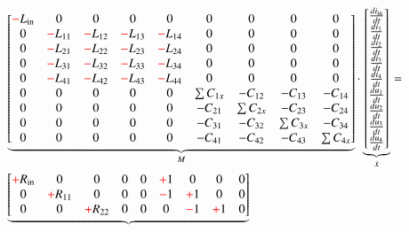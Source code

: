 \begin{refsection}
{\footnotesize 
\begin{align}
			&
			\underbrace{\begin{bmatrix}
			\color{red}-\color{black}L_\mathrm{in}&0&0&0&0 & 0&0&0&0 \\
			0&\color{red}-\color{black}L_{11}&\color{red}-\color{black}L_{12}&\color{red}-\color{black}L_{13}&\color{red}-\color{black}L_{14} & 0&0&0&0 \\
			0&\color{red}-\color{black}L_{21}&\color{red}-\color{black}L_{22}&\color{red}-\color{black}L_{23}&\color{red}-\color{black}L_{24} & 0&0&0&0 \\
			0&\color{red}-\color{black}L_{31}&\color{red}-\color{black}L_{32}&\color{red}-\color{black}L_{33}&\color{red}-\color{black}L_{34} & 0&0&0&0 \\
			0&\color{red}-\color{black}L_{41}&\color{red}-\color{black}L_{42}&\color{red}-\color{black}L_{43}&\color{red}-\color{black}L_{44} & 0&0&0&0 \\
			0&0&0&0&0 & \sum{C_{1x}}&-C_{12}&-C_{13}&-C_{14} \\
			0&0&0&0&0 & -C_{21}&\sum{C_{2x}}&-C_{23}&-C_{24} \\
			0&0&0&0&0 & -C_{31}&-C_{32}&\sum{C_{3x}}&-C_{34} \\
			0&0&0&0&0 & -C_{41}&-C_{42}&-C_{43}&\sum{C_{4x}}
			    \end{bmatrix}}_{\text{$M$}}
			\cdot
			\underbrace{\begin{bmatrix}
			\frac{di_\mathrm{in}}{dt} \\
			\frac{di_1}{dt} \\
			\frac{di_2}{dt} \\
			\frac{di_3}{dt} \\
			\frac{di_4}{dt} \\
			\frac{du_1}{dt} \\
			\frac{du_2}{dt} \\
			\frac{du_3}{dt} \\
			\frac{du_4}{dt}
			\end{bmatrix}}_{\text{$\dot{x}$}}
			= \nonumber \\
			&
			\underbrace{\begin{bmatrix}
			\color{red}+\color{black}R_\mathrm{in}&0&0&0&0 & \color{red}+\color{black}1&0&0&0 \\
			0&\color{red}+\color{black}R_{11}&0&0&0 & \color{red}-\color{black}1&\color{red}+\color{black}1&0&0 \\
			0&0&\color{red}+\color{black}R_{22}&0&0 & 0&\color{red}-\color{black}1&\color{red}+\color{black}1&0 \\

\end{bmatrix}}
\end{align}}
\end{refsection}
